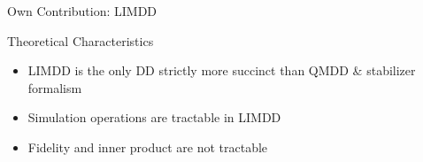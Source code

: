 \begin{refframe}{\alert{Own Contribution:} LIMDD}
	
%

\vspace{-.5em}

\begin{block}{Theoretical Characteristics~\cite{vinkhuijzen2023efficient}}
\vspace{-.5em}
	\begin{itemize}
		\item<+-> LIMDD is the only DD strictly more succinct than QMDD \& stabilizer formalism 
		\item<+-> Simulation operations are tractable in LIMDD
		\item<+-> Fidelity and inner product are not tractable~\cite{vinkhuijzen2024a}
	\end{itemize}
	\vspace{-.5em}
\end{block}

~\\


\begin{columns}
\begin{column}{.45\textwidth}	
\centering
{}
\end{column}
\end{columns}
\end{refframe}

